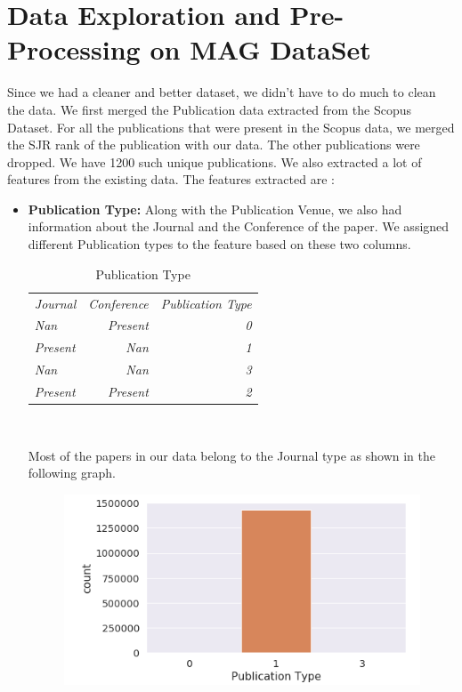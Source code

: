 \documentclass[a4paper, 11pt]{article}
\begin{document}
\section*{Data Exploration and Pre-Processing on MAG DataSet}
\FloatBarrier
Since we had a cleaner and better dataset, we didn't have to do much to clean the data. We first merged the Publication data extracted from the Scopus Dataset. For all the publications that were present in the Scopus data, we merged the SJR rank of the publication with our data. The other publications were dropped. We have 1200 such unique publications. We also extracted a lot of features from the existing data.  The features extracted are :\newline
\begin{itemize}
    \item \textbf{Publication Type:} Along with the Publication Venue, we also had information about the Journal and the Conference of the paper. We assigned different Publication types to the feature based on these two columns.
    \begin{table}[h]
  \centering
  \begin{tabular}{l | r | r}
    {\small \textit{Journal}}& {\small \textit{Conference}} & {\small \textit{Publication Type}}\\
    {\small \textit{Nan}} & {\small \textit{Present}} & {\small \textit{0}}\\
    {\small \textit{Present}} & {\small \textit{Nan}} & {\small \textit{1}}\\
    {\small \textit{Nan}} & {\small \textit{Nan}} & {\small \textit{3}}\\
    {\small \textit{Present}} & {\small \textit{Present}} & {\small \textit{2}}\\
  \end{tabular}
  \caption{Publication Type}~\label{tab:table1}
\end{table}
\newline
Most of the papers in our data belong to the Journal type as shown in the following graph.
\begin{figure}[ht]
\centering
  \includegraphics[width=0.6\columnwidth]{PublicationType.png}

\end{figure}
\end{itemize}
\end{document}
